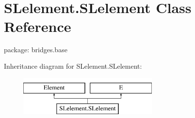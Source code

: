 \hypertarget{class_s_lelement_1_1_s_lelement}{}\section{S\+Lelement.\+S\+Lelement Class Reference}
\label{class_s_lelement_1_1_s_lelement}


package\+: bridges.\+base  


Inheritance diagram for S\+Lelement.\+S\+Lelement\+:\begin{figure}[H]
\begin{center}
\leavevmode
\includegraphics[height=2.000000cm]{class_s_lelement_1_1_s_lelement}
\end{center}
\end{figure}
